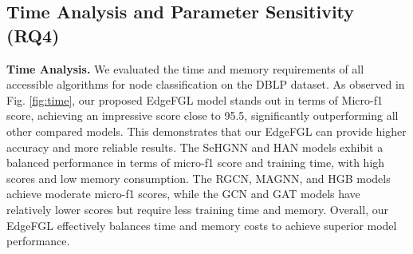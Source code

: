 \subsection{Time Analysis and Parameter Sensitivity (\textbf{RQ4})} \label{sec:time}
{\bf Time Analysis.}
We evaluated the time and memory requirements of all accessible algorithms for node classification on the DBLP dataset. 
As observed in Fig. \ref{fig:time}, our proposed EdgeFGL model stands out in terms of Micro-f1 score, achieving an impressive score close to 95.5, significantly outperforming all other compared models. 
This demonstrates that our EdgeFGL can provide higher accuracy and more reliable results. 
The SeHGNN and HAN models exhibit a balanced performance in terms of micro-f1 score and training time, with high scores and low memory consumption. 
The RGCN, MAGNN, and HGB models achieve moderate micro-f1 scores, while the GCN and GAT models have relatively lower scores but require less training time and memory. 
Overall, our EdgeFGL effectively balances time and memory costs to achieve superior model performance. 


